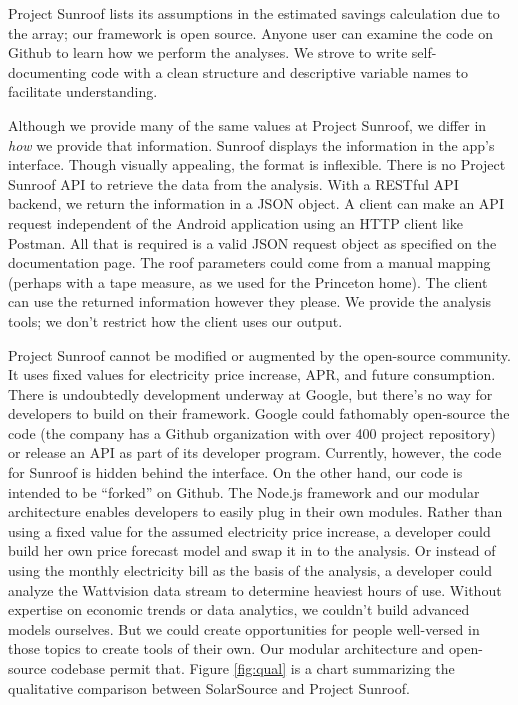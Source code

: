 \documentclass[pageno]{jpaper}
\begin{document}
Project Sunroof lists its assumptions in the estimated savings calculation due to the array; our framework is open source. Anyone user can examine the code on Github to learn how we perform the analyses. We strove to write self-documenting code with a clean structure and descriptive variable names to facilitate understanding.

Although we provide many of the same values at Project Sunroof, we differ in {\em how} we provide that information. Sunroof displays the information in the app's interface. Though visually appealing, the format is inflexible. There is no Project Sunroof API to retrieve the data from the analysis. With a RESTful API backend, we return the information in a JSON object.  A client can make an API request independent of the Android application using an HTTP client like Postman. All that is required is a valid JSON request object as specified on the documentation page. The roof parameters could come from a manual mapping (perhaps with a tape measure, as we used for the Princeton home).  The client can use the returned information however they please. We provide the analysis tools; we don't restrict how the client uses our output.

Project Sunroof cannot be modified or augmented by the open-source community. It uses fixed values for electricity price increase, APR, and future consumption. There is undoubtedly development underway at Google, but there's no way for developers to build on their framework. Google could fathomably open-source the code (the company has a Github organization with over 400 project repository) or release an API as part of its developer program. Currently, however, the code for Sunroof is hidden behind the interface. On the other hand, our code is intended to be ``forked'' on Github. The Node.js framework and our modular architecture enables developers to easily plug in their own modules. Rather than using a fixed value for the assumed electricity price increase, a developer could build her own price forecast model and swap it in to the analysis. Or instead of using the monthly electricity bill as the basis of the analysis, a developer could analyze the Wattvision data stream to determine heaviest hours of use. Without expertise on economic trends or data analytics, we couldn't build advanced models ourselves. But we could create opportunities for people well-versed in those topics to create tools of their own. Our modular architecture and open-source codebase permit that. Figure \ref{fig:qual} is a chart summarizing the qualitative comparison between SolarSource and Project Sunroof.
\end{document}
